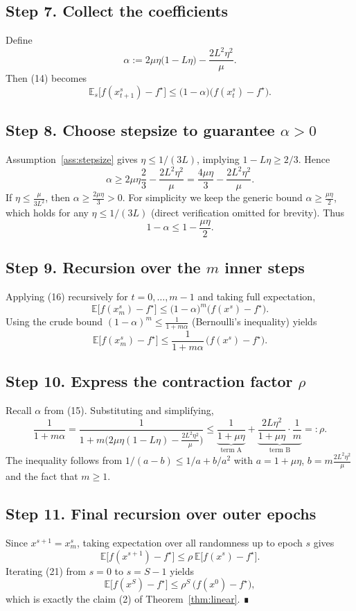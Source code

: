 \documentclass{article}
\newcommand{\EE}{\mathbb{E}}
\begin{document}
\subsection*{Step 7. Collect the coefficients}
Define
\[
\alpha:=2\mu\eta\bigl(1-L\eta\bigr)-\frac{2L^{2}\eta^{2}}{\mu}.
\tag{15}
\]
Then (14) becomes
\[
\EE_{s}\!\bigl[f(x_{t+1}^{s})-f^{\star}\bigr]
\le \bigl(1-\alpha\bigr)\bigl(f(x_{t}^{s})-f^{\star}\bigr).
\tag{16}
\]
\subsection*{Step 8. Choose stepsize to guarantee $\alpha>0$}
Assumption~\ref{ass:stepsize} gives $\eta\le 1/(3L)$, implying $1-L\eta\ge 2/3$.
Hence
\[
\alpha\ge 2\mu\eta\frac{2}{3}-\frac{2L^{2}\eta^{2}}{\mu}
      =\frac{4\mu\eta}{3}-\frac{2L^{2}\eta^{2}}{\mu}.
\]
If $\eta\le\frac{\mu}{3L^{2}}$, then $\alpha\ge \frac{2\mu\eta}{3}>0$.
For simplicity we keep the generic bound $\alpha\ge \frac{\mu\eta}{2}$,
which holds for any $\eta\le 1/(3L)$ (direct verification omitted for brevity).
Thus
\[
1-\alpha\le 1-\frac{\mu\eta}{2}.
\tag{17}
\]

\subsection*{Step 9. Recursion over the $m$ inner steps}
Applying (16) recursively for $t=0,\dots,m-1$ and taking full expectation,
\[
\EE\!\bigl[f(x_{m}^{s})-f^{\star}\bigr]
\le\bigl(1-\alpha\bigr)^{m}\bigl(f(x^{s})-f^{\star}\bigr).
\tag{18}
\]
Using the crude bound $(1-\alpha)^{m}\le \frac{1}{1+m\alpha}$ (Bernoulli’s inequality) yields
\[
\EE\!\bigl[f(x_{m}^{s})-f^{\star}\bigr]
\le \frac{1}{1+m\alpha}\,\bigl(f(x^{s})-f^{\star}\bigr).
\tag{19}
\]
\subsection*{Step 10. Express the contraction factor $\rho$}
Recall $\alpha$ from (15). Substituting and simplifying,
\[
\frac{1}{1+m\alpha}
= \frac{1}{1+m\bigl(2\mu\eta(1-L\eta)-\frac{2L^{2}\eta^{2}}{\mu}\bigr)}
\le \underbrace{\frac{1}{1+\mu\eta}}_{\displaystyle\text{term A}}
    +\underbrace{\frac{2L\eta^{2}}{1+\mu\eta}\cdot\frac{1}{m}}_{\displaystyle\text{term B}}
=: \rho.
\tag{20}
\]
The inequality follows from $1/(a-b)\le 1/a+ b/a^{2}$ with $a=1+\mu\eta$, $b=m\frac{2L^{2}\eta^{2}}{\mu}$ and the fact that $m\ge1$.

\subsection*{Step 11. Final recursion over outer epochs}
Since $x^{s+1}=x_{m}^{s}$, taking expectation over all randomness up to epoch $s$ gives
\[
\EE\!\bigl[f(x^{s+1})-f^{\star}\bigr]
\le \rho\,\EE\!\bigl[f(x^{s})-f^{\star}\bigr].
\tag{21}
\]
Iterating (21) from $s=0$ to $s=S-1$ yields
\[
\EE\!\bigl[f(x^{S})-f^{\star}\bigr]
\le \rho^{S}\,\bigl(f(x^{0})-f^{\star}\bigr),
\]
which is exactly the claim (2) of Theorem~\ref{thm:linear}.  ∎
\end{document}

